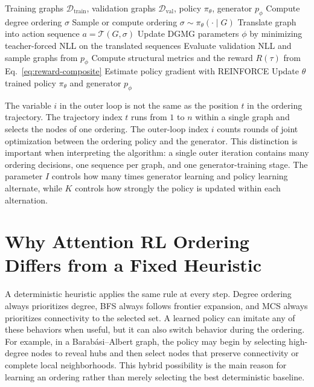 \begin{algorithm}[H]
\caption{Attention RL ordering with alternating DGMG training}
\label{alg:attention-rl-ordering}
\begin{algorithmic}[1]
\Require Training graphs $\mathcal{D}_{\mathrm{train}}$, validation graphs $\mathcal{D}_{\mathrm{val}}$, policy $\pi_\theta$, generator $p_\phi$
            \State Compute degree ordering $\sigma$
        \Else
            \State Sample or compute ordering $\sigma\sim\pi_\theta(\cdot\mid G)$
        \EndIf
        \State Translate graph into action sequence $a=\mathcal{T}(G,\sigma)$
    \EndFor
    \State Update DGMG parameters $\phi$ by minimizing teacher-forced NLL on the translated sequences
    \State Evaluate validation NLL and sample graphs from $p_\phi$
    \State Compute structural metrics and the reward $R(\tau)$ from Eq.~\eqref{eq:reward-composite}
        \State Estimate policy gradient with REINFORCE
        \State Update $\theta$
    \EndFor
\EndFor
\State \Return trained policy $\pi_\theta$ and generator $p_\phi$
\end{algorithmic}
\end{algorithm}

The variable $i$ in the outer loop is not the same as the position $t$ in the ordering trajectory. The trajectory index $t$ runs from $1$ to $n$ within a single graph and selects the nodes of one ordering. The outer-loop index $i$ counts rounds of joint optimization between the ordering policy and the generator. This distinction is important when interpreting the algorithm: a single outer iteration contains many ordering decisions, one sequence per graph, and one generator-training stage. The parameter $I$ controls how many times generator learning and policy learning alternate, while $K$ controls how strongly the policy is updated within each alternation.

\section{Why Attention RL Ordering Differs from a Fixed Heuristic}
\label{sec:rl-hybrid-behavior}

A deterministic heuristic applies the same rule at every step. Degree ordering always prioritizes degree, BFS always follows frontier expansion, and MCS always prioritizes connectivity to the selected set. A learned policy can imitate any of these behaviors when useful, but it can also switch behavior during the ordering. For example, in a Barab\'asi--Albert graph, the policy may begin by selecting high-degree nodes to reveal hubs and then select nodes that preserve connectivity or complete local neighborhoods. This hybrid possibility is the main reason for learning an ordering rather than merely selecting the best deterministic baseline.

